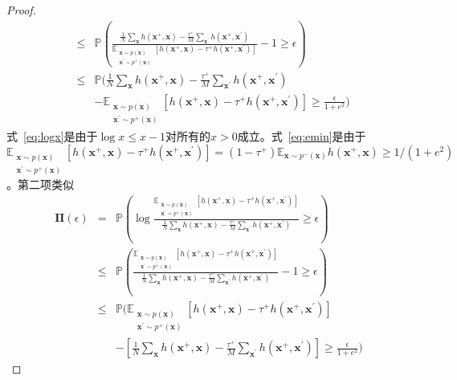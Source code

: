 \begin{lemma}
\begin{proof}
\begin{eqnarray}
			&\leq& \mathbb{P} \left( \frac{\frac{1}{N}  \sum_{\mathbf{x}} h(\mathbf{x}^+,\mathbf{x})  -\frac{\tau^+}{M} \sum_{\mathbf{x}^\prime} h(\mathbf{x}^+,\mathbf{x}^\prime)}{\mathbb{E}_{\substack{\mathbf x \sim p(\mathbf x) \\ \mathbf x^\prime \sim p^+(\mathbf x)}} [ h(\mathbf{x}^+,\mathbf{x}) - \tau^+h(\mathbf{x}^+,\mathbf{x}^\prime)]}-1 \geq \epsilon  \right) \label{eq:logx}\\
			&\leq& \mathbb{P} ( \frac{1}{N}  \sum_{\mathbf{x}} h(\mathbf{x}^+,\mathbf{x})  -\frac{\tau^+}{M} \sum_{\mathbf{x}^\prime} h(\mathbf{x}^+,\mathbf{x}^\prime)  \nonumber \\ &&-\mathbb{E}_{\substack{\mathbf x \sim p(\mathbf x) \\ \mathbf x^\prime \sim p^+(\mathbf x)}} [ h(\mathbf{x}^+,\mathbf{x}) - \tau^+h(\mathbf{x}^+,\mathbf{x}^\prime)] \geq \frac{\epsilon}{1+e^2}  ) \label{eq:emin}
		\end{eqnarray}
式~\eqref{eq:logx}是由于$\log x \leq x-1$对所有的$x>0$成立。式~\eqref{eq:emin}是由于 $\mathbb{E}_{\substack{\mathbf x \sim p(\mathbf x) \\ \mathbf x^\prime \sim p^+(\mathbf x)}} [ h(\mathbf{x}^+,\mathbf{x}) - \tau^+h(\mathbf{x}^+,\mathbf{x}^\prime)] =(1-\tau^+)\mathbb{E}_{\mathbf x \sim p^-(\mathbf x)}  h(\mathbf{x}^+,\mathbf{x}) \geq 1/(1+e^2)$。第二项类似
		\begin{eqnarray}
\mathbf{II}(\epsilon)&=& \mathbb{P} \left(\log 
			\frac{\mathbb{E}_{\substack{\mathbf x \sim p(\mathbf x) \\ \mathbf x^\prime \sim p^+(\mathbf x)}} [ h(\mathbf{x}^+,\mathbf{x}) - \tau^+h(\mathbf{x}^+,\mathbf{x}^\prime)]}{\frac{1}{N}  \sum_{\mathbf{x}} h(\mathbf{x}^+,\mathbf{x})  -\frac{\tau^+}{M} \sum_{\mathbf{x}^\prime} h(\mathbf{x}^+,\mathbf{x}^\prime)} \geq \epsilon  \right) \nonumber\\
			&\leq& \mathbb{P} \left( \frac{\mathbb{E}_{\substack{\mathbf x \sim p(\mathbf x) \\ \mathbf x^\prime \sim p^+(\mathbf x)}} [ h(\mathbf{x}^+,\mathbf{x}) - \tau^+h(\mathbf{x}^+,\mathbf{x}^\prime)]}{\frac{1}{N}  \sum_{\mathbf{x}} h(\mathbf{x}^+,\mathbf{x})  -\frac{\tau^+}{M} \sum_{\mathbf{x}^\prime} h(\mathbf{x}^+,\mathbf{x}^\prime)} -1 \geq \epsilon  \right) \label{eq:logxii}\nonumber\\
			&\leq& \mathbb{P} (\mathbb{E}_{\substack{\mathbf x \sim p(\mathbf x) \\ \mathbf x^\prime \sim p^+(\mathbf x)}} [ h(\mathbf{x}^+,\mathbf{x}) - \tau^+h(\mathbf{x}^+,\mathbf{x}^\prime)]  \nonumber \\ &&- [\frac{1}{N}  \sum_{\mathbf{x}} h(\mathbf{x}^+,\mathbf{x})  -\frac{\tau^+}{M} \sum_{\mathbf{x}^\prime} h(\mathbf{x}^+,\mathbf{x}^\prime)]  \geq \frac{\epsilon}{1+e^2}  ) \label{eq:eminii}

\end{eqnarray}
\end{proof}
\end{lemma}
